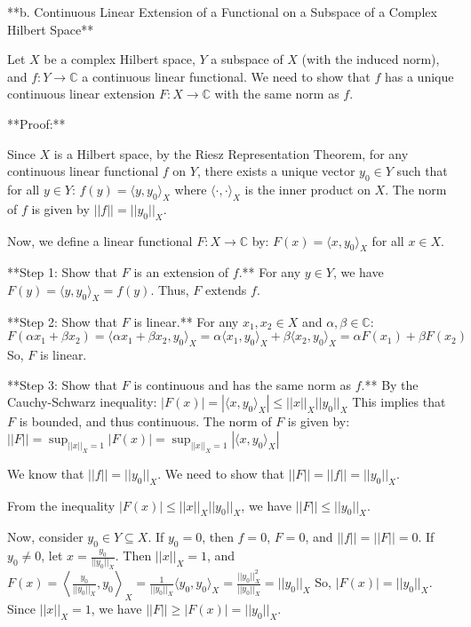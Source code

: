 **b. Continuous Linear Extension of a Functional on a Subspace of a Complex Hilbert Space**

Let $X$ be a complex Hilbert space, $Y$ a subspace of $X$ (with the induced norm), and $f: Y \to \mathbb{C}$ a continuous linear functional. We need to show that $f$ has a unique continuous linear extension $F: X \to \mathbb{C}$ with the same norm as $f$.

**Proof:**

Since $X$ is a Hilbert space, by the Riesz Representation Theorem, for any continuous linear functional $f$ on $Y$, there exists a unique vector $y_0 \in Y$ such that for all $y \in Y$:
$f(y) = \langle y, y_0 \rangle_X$
where $\langle \cdot, \cdot \rangle_X$ is the inner product on $X$.
The norm of $f$ is given by $||f|| = ||y_0||_X$.

Now, we define a linear functional $F: X \to \mathbb{C}$ by:
$F(x) = \langle x, y_0 \rangle_X$ for all $x \in X$.

**Step 1: Show that $F$ is an extension of $f$.**
For any $y \in Y$, we have $F(y) = \langle y, y_0 \rangle_X = f(y)$. Thus, $F$ extends $f$.

**Step 2: Show that $F$ is linear.**
For any $x_1, x_2 \in X$ and $\alpha, \beta \in \mathbb{C}$:
$F(\alpha x_1 + \beta x_2) = \langle \alpha x_1 + \beta x_2, y_0 \rangle_X = \alpha \langle x_1, y_0 \rangle_X + \beta \langle x_2, y_0 \rangle_X = \alpha F(x_1) + \beta F(x_2)$
So, $F$ is linear.

**Step 3: Show that $F$ is continuous and has the same norm as $f$.**
By the Cauchy-Schwarz inequality:
$|F(x)| = |\langle x, y_0 \rangle_X| \le ||x||_X ||y_0||_X$
This implies that $F$ is bounded, and thus continuous. The norm of $F$ is given by:
$||F|| = \sup_{||x||_X = 1} |F(x)| = \sup_{||x||_X = 1} |\langle x, y_0 \rangle_X|$

We know that $||f|| = ||y_0||_X$. We need to show that $||F|| = ||f|| = ||y_0||_X$.

From the inequality $|F(x)| \le ||x||_X ||y_0||_X$, we have $||F|| \le ||y_0||_X$.

Now, consider $y_0 \in Y \subseteq X$. If $y_0 = 0$, then $f = 0$, $F = 0$, and $||f|| = ||F|| = 0$.
If $y_0 \neq 0$, let $x = \frac{y_0}{||y_0||_X}$. Then $||x||_X = 1$, and
$F(x) = \left\langle \frac{y_0}{||y_0||_X}, y_0 \right\rangle_X = \frac{1}{||y_0||_X} \langle y_0, y_0 \rangle_X = \frac{||y_0||_X^2}{||y_0||_X} = ||y_0||_X$
So, $|F(x)| = ||y_0||_X$. Since $||x||_X = 1$, we have $||F|| \ge |F(x)| = ||y_0||_X$.

